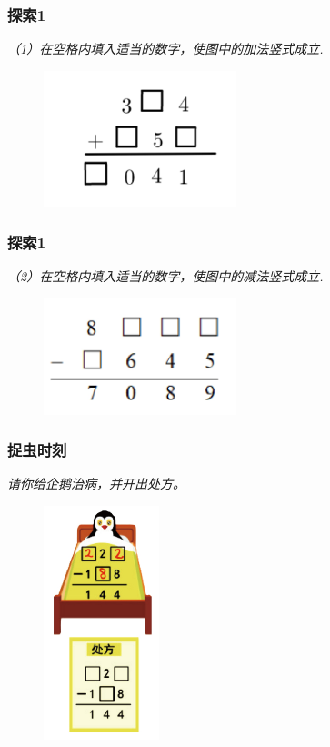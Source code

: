 \begin{frame}
    \frametitle{探索1}
    \textit{（1）在空格内填入适当的数字，使图中的加法竖式成立.}
    \begin{figure}[H] 
        \centering
        \includegraphics[width=0.5\textwidth]{./pics/Chapter_3/tansuo1_1.png}
    \end{figure}
\end{frame}

\begin{frame}
    \frametitle{探索1}
    \textit{（2）在空格内填入适当的数字，使图中的减法竖式成立.}
    \begin{figure}[H] 
        \centering
        \includegraphics[width=0.5\textwidth]{./pics/Chapter_3/tansuo1_2.png}
    \end{figure}
\end{frame}

\begin{frame}
    \frametitle{捉虫时刻}
    \textit{请你给企鹅治病，并开出处方。}
    \begin{figure}[H] 
        \centering
        \includegraphics[width=0.3\textwidth]{./pics/Chapter_3/zhuochong.png}
    \end{figure}
\end{frame}

